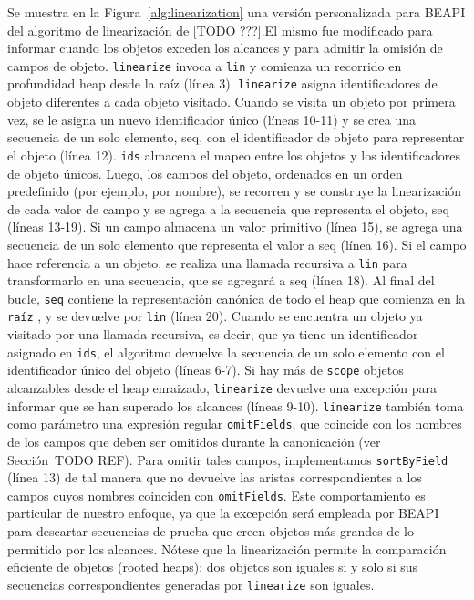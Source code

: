Se muestra en la Figura~\ref{alg:linearization} una versión personalizada para \textsf{BEAPI} del algoritmo de linearización de [TODO ???].El mismo fue modificado para informar cuando los objetos exceden los alcances y para admitir la omisión de campos de objeto. \texttt{linearize} invoca a \texttt{lin} y  comienza un recorrido en profundidad heap desde la raíz (línea 3). \texttt{linearize} asigna identificadores de objeto diferentes a cada objeto visitado. Cuando se visita un objeto por primera vez, se le asigna un nuevo identificador único (líneas 10-11) y se crea una secuencia de un solo elemento, seq, con el identificador de objeto para representar el objeto (línea 12). \texttt{ids} almacena el mapeo entre los objetos y los identificadores de objeto únicos. Luego, los campos del objeto, ordenados en un orden predefinido (por ejemplo, por nombre), se recorren y se construye la linearización de cada valor de campo y se agrega a la secuencia que representa el objeto, seq (líneas 13-19). Si un campo almacena un valor primitivo (línea 15), se agrega una secuencia de un solo elemento que representa el valor a seq (línea 16). Si el campo hace referencia a un objeto, se realiza una llamada recursiva a \texttt{lin}  para transformarlo en una secuencia, que se agregará a seq (línea 18). Al final del bucle, \texttt{seq}  contiene la representación canónica de todo el heap que comienza en la \texttt{raíz} , y se devuelve por \texttt{lin} (línea 20). Cuando se encuentra un objeto ya visitado por una llamada recursiva, es decir, que ya tiene un identificador asignado en  \texttt{ids}, el algoritmo devuelve la secuencia de un solo elemento con el identificador único del objeto (líneas 6-7). Si hay más de \texttt{scope} objetos alcanzables desde el heap enraizado, \texttt{linearize} devuelve una excepción para informar que se han superado los alcances (líneas 9-10). \texttt{linearize} también toma como parámetro una expresión regular \texttt{omitFields}, que coincide con los nombres de los campos que deben ser omitidos durante la canonicación (ver Sección~TODO REF). Para omitir tales campos, implementamos \texttt{sortByField} (línea 13) de tal manera que no devuelve las aristas correspondientes a los campos cuyos nombres coinciden con \texttt{omitFields}. Este comportamiento es particular de nuestro enfoque, ya que la excepción será empleada por BEAPI para descartar secuencias de prueba que creen objetos más grandes de lo permitido por los alcances. Nótese que la linearización permite la comparación eficiente de objetos (rooted heaps): dos objetos son iguales si y solo si sus secuencias correspondientes generadas por \texttt{linearize} son iguales.


